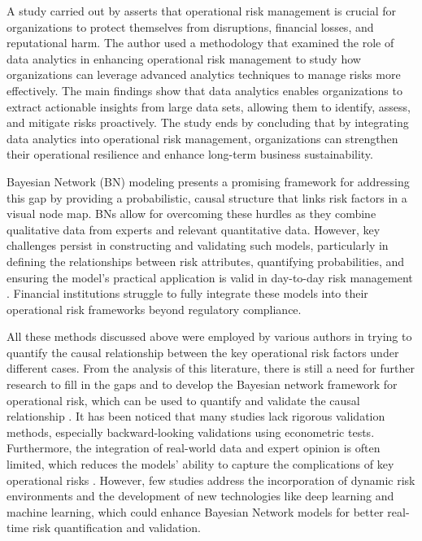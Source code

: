 A study carried out by \textcite{eze2024harnessing} asserts that operational risk management is crucial for organizations to protect themselves from disruptions, financial losses, and reputational harm. The author used a methodology that examined the role of data analytics in enhancing operational risk management to study how organizations can leverage advanced analytics techniques to manage risks more effectively. The main findings show that data analytics enables organizations to extract actionable insights from large data sets, allowing them to identify, assess, and mitigate risks proactively. The study ends by concluding that by integrating data analytics into operational risk management, organizations can strengthen their operational resilience and enhance long-term business sustainability.

Bayesian Network (BN) modeling presents a promising framework for addressing this gap by providing a probabilistic, causal structure that links risk factors in a visual node map. BNs allow for overcoming these hurdles as they combine qualitative data from experts and relevant quantitative data. However, key challenges persist in constructing and validating such models, particularly in defining the relationships between risk attributes, quantifying probabilities, and ensuring the model's practical application is valid in day-to-day risk management \parencite{dimaio2022integration}. Financial institutions struggle to fully integrate these models into their operational risk frameworks beyond regulatory compliance.

All these methods discussed above were employed by various authors in trying to quantify the causal relationship between the key operational risk factors under different cases. From the analysis of this literature, there is still a need for further research to fill in the gaps and to develop the Bayesian network framework for operational risk, which can be used to quantify and validate the causal relationship \parencite{liu_bayesian_2022}. It has been noticed that many studies lack rigorous validation methods, especially backward-looking validations using econometric tests. Furthermore, the integration of real-world data and expert opinion is often limited, which reduces the models’ ability to capture the complications of key operational risks \parencite{cheng2025deep}. However, few studies address the incorporation of dynamic risk environments and the development of new technologies like deep learning and machine learning, which could enhance Bayesian Network models for better real-time risk quantification and validation.


